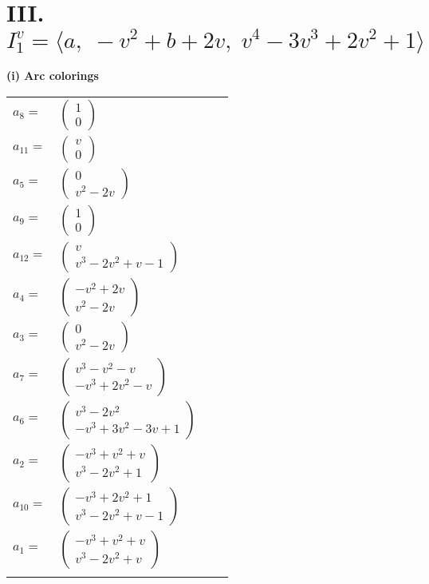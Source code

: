 \documentclass[1p]{elsarticle_modified}
\theoremstyle{definition}
\begin{document}
\centering \section*{III. $I^v_{1}= \langle a,\;- v^2+b+2 v,\;v^4-3 v^3+2 v^2+1 \rangle$}
\flushleft \textbf{(i) Arc colorings}\\
\begin{tabular}{m{7pt} m{180pt} m{7pt} m{180pt} }
\flushright $a_{8}=$&$\begin{pmatrix}1\\0\end{pmatrix}$ \\
\flushright $a_{11}=$&$\begin{pmatrix}v\\0\end{pmatrix}$ \\
\flushright $a_{5}=$&$\begin{pmatrix}0\\v^2-2 v\end{pmatrix}$ \\
\flushright $a_{9}=$&$\begin{pmatrix}1\\0\end{pmatrix}$ \\
\flushright $a_{12}=$&$\begin{pmatrix}v\\v^3-2 v^2+v-1\end{pmatrix}$ \\
\flushright $a_{4}=$&$\begin{pmatrix}- v^2+2 v\\v^2-2 v\end{pmatrix}$ \\
\flushright $a_{3}=$&$\begin{pmatrix}0\\v^2-2 v\end{pmatrix}$ \\
\flushright $a_{7}=$&$\begin{pmatrix}v^3- v^2- v\\- v^3+2 v^2- v\end{pmatrix}$ \\
\flushright $a_{6}=$&$\begin{pmatrix}v^3-2 v^2\\- v^3+3 v^2-3 v+1\end{pmatrix}$ \\
\flushright $a_{2}=$&$\begin{pmatrix}- v^3+v^2+v\\v^3-2 v^2+1\end{pmatrix}$ \\
\flushright $a_{10}=$&$\begin{pmatrix}- v^3+2 v^2+1\\v^3-2 v^2+v-1\end{pmatrix}$ \\
\flushright $a_{1}=$&$\begin{pmatrix}- v^3+v^2+v\\v^3-2 v^2+v\end{pmatrix}$\\&\end{tabular}
\end{document}
